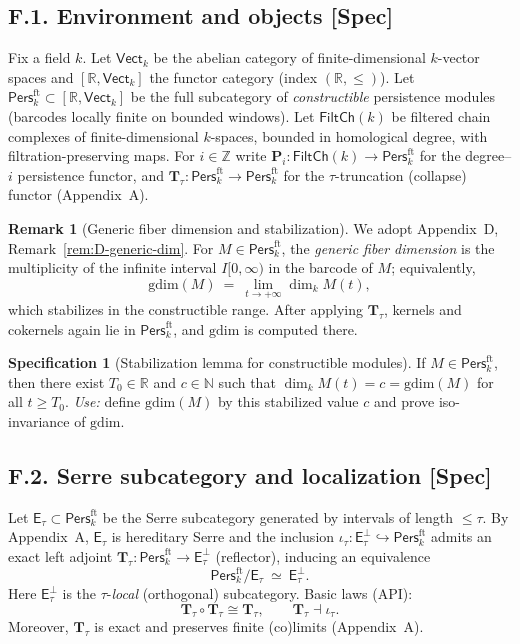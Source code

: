 \documentclass[11pt]{article}
\newcommand{\Pers}{\mathsf{Pers}}
\numberwithin{equation}{section}
\theoremstyle{definition}
\newtheorem{remark}[theorem]{Remark}
\newtheorem{specification}[theorem]{Specification}
\begin{document}
\subsection*{F.1. Environment and objects [Spec]}
Fix a field \(k\).
Let \(\mathsf{Vect}_k\) be the abelian category of finite-dimensional \(k\)-vector spaces and
\([\mathbb{R},\mathsf{Vect}_k]\) the functor category (index \((\mathbb{R},\le)\)).
Let \(\Pers^{\mathrm{ft}}_k\subset[\mathbb{R},\mathsf{Vect}_k]\) be the full subcategory of \emph{constructible}
persistence modules (barcodes locally finite on bounded windows).
Let \(\mathsf{FiltCh}(k)\) be filtered chain complexes of finite-dimensional \(k\)-spaces, bounded in homological degree,
with filtration-preserving maps. For \(i\in\mathbb{Z}\) write \(\mathbf{P}_i:\mathsf{FiltCh}(k)\to\Pers^{\mathrm{ft}}_k\)
for the degree–\(i\) persistence functor, and \(\mathbf{T}_\tau:\Pers^{\mathrm{ft}}_k\to\Pers^{\mathrm{ft}}_k\) for the
\(\tau\)-truncation (collapse) functor (Appendix~A).

\begin{remark}[Generic fiber dimension and stabilization]\label{F:rk:generic-fiber}
We adopt Appendix~D, Remark~\ref{rem:D-generic-dim}. For \(M\in\Pers^{\mathrm{ft}}_k\), the \emph{generic fiber dimension}
is the multiplicity of the infinite interval \(I[0,\infty)\) in the barcode of \(M\); equivalently,
\[
\mathrm{gdim}(M)\ =\ \lim_{t\to +\infty}\dim_k M(t),
\]
which stabilizes in the constructible range.
After applying \(\mathbf{T}_\tau\), kernels and cokernels again lie in \(\Pers^{\mathrm{ft}}_k\), and \(\mathrm{gdim}\)
is computed there.
\end{remark}

\begin{specification}[Stabilization lemma for constructible modules]\label{F:spec:stabilize}
If \(M\in\Pers^{\mathrm{ft}}_k\), then there exist \(T_0\in\mathbb{R}\) and \(c\in\mathbb{N}\) such that
\(\dim_k M(t)=c=\mathrm{gdim}(M)\) for all \(t\ge T_0\).
\emph{Use:} define \(\mathrm{gdim}(M)\) by this stabilized value \(c\) and prove iso-invariance of \(\mathrm{gdim}\).
\end{specification}

\subsection*{F.2. Serre subcategory and localization [Spec]}
Let \(\mathsf{E}_\tau\subset \Pers^{\mathrm{ft}}_k\) be the Serre subcategory generated by intervals of length \(\le\tau\).
By Appendix~A, \(\mathsf{E}_\tau\) is hereditary Serre and the inclusion
\(\iota_\tau:\mathsf{E}_\tau^\perp\hookrightarrow \Pers^{\mathrm{ft}}_k\) admits an exact left adjoint
\(\mathbf{T}_\tau:\Pers^{\mathrm{ft}}_k\to \mathsf{E}_\tau^\perp\) (reflector), inducing an equivalence
\[
\Pers^{\mathrm{ft}}_k/\mathsf{E}_\tau\ \simeq\ \mathsf{E}_\tau^\perp.
\]
Here \(\mathsf{E}_\tau^\perp\) is the \(\tau\)-\emph{local} (orthogonal) subcategory.
Basic laws (API):
\[
\mathbf{T}_\tau\circ \mathbf{T}_\tau \cong \mathbf{T}_\tau,\qquad \mathbf{T}_\tau \dashv \iota_\tau .
\]
Moreover, \(\mathbf{T}_\tau\) is exact and preserves finite (co)limits (Appendix~A).
\end{document}
